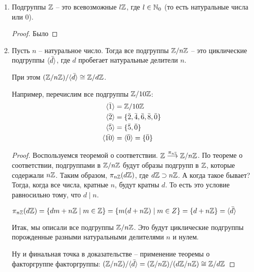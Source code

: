 \follow \begin{enumerate}
    \item Подгруппы $\mathbb{Z}$ -- это всевозможные $l \mathbb{Z}$, где $l \in \mathbb{N}_0$ (то есть натуральные числа или 0). 
    \begin{proof}
        Было
    \end{proof}
    \item Пусть $n$ -- натуральное число. Тогда все подгруппы $\mathbb{Z} / n\mathbb{Z}$ -- это циклические подгруппы $\langle \bar d \rangle$, 
    где $d$ пробегает натуральные делители $n$. 
    
    При этом $(\mathbb{Z}/ n\mathbb{Z})/ \langle \bar d \rangle \cong \mathbb{Z}/d\mathbb{Z}$. 
    
    Например, перечислим все подгруппы $\mathbb{Z}/10\mathbb{Z}$: 
    \begin{align*}
        \langle \bar 1 \rangle &= \mathbb{Z}/ 10 \mathbb{Z} \\
        \langle \bar 2 \rangle &= \{\bar 2, \bar 4, \bar 6, \bar 8, \bar 0\} \\
        \langle \bar 5 \rangle &= \{\bar 5, \bar 0\} \\
        \langle \bar{10} \rangle &= \langle \bar 0 \rangle = \{\bar 0\} \\
    \end{align*}
    \begin{proof}
        Воспользуемся теоремой о соответствии. $\mathbb{Z}  \overset{\pi_{n\mathbb{Z}}}{\longrightarrow} \mathbb{Z}/ n\mathbb{Z}$. По теореме о соответствии, 
        подгруппами в $\mathbb{Z}/ n\mathbb{Z}$ будут образы подгрупп в $\mathbb{Z}$, которые содержали $n\mathbb{Z}$. Таким образом, $\pi_{n\mathbb{Z}}(d\mathbb{Z})$, где 
        $d\mathbb{Z} \supset n\mathbb{Z}$. А когда такое бывает? Тогда, когда все числа, кратные $n$, будут кратны $d$. То есть это условие 
        равносильно тому, что $d \mid n$.

        $\pi_{n\mathbb{Z}}(d\mathbb{Z}) = \{dm + n\mathbb{Z}\mid m \in \mathbb{Z}\} = \{m (d + n\mathbb{Z})\mid m \in Z\} = \{d + n\mathbb{Z}\} = \langle \bar d \rangle$

        Итак, мы описали все подгруппы $\mathbb{Z}/ n\mathbb{Z}$. Это будут циклические подгруппы порожденные разными натуральными 
        делителями $n$ и нулем. 

        Ну и финальная точка в доказательстве -- применение теоремы о факторгруппе факторгруппы: $(\mathbb{Z}/n\mathbb{Z})/\langle \bar d \rangle = (\mathbb{Z}/n\mathbb{Z})/(d\mathbb{Z}/ n\mathbb{Z}) \cong \mathbb{Z}/d\mathbb{Z}$
    \end{proof}
\end{enumerate}

